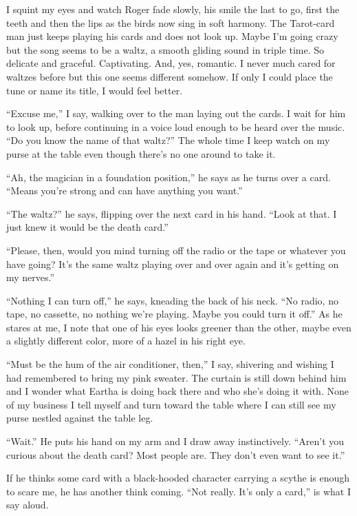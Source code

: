 \documentclass[
]{article}
\begin{document}
I squint my eyes and watch Roger fade slowly, his smile the last to go,
first the teeth and then the lips as the birds now sing in soft harmony.
The Tarot-card man just keeps playing his cards and does not look up.
Maybe I'm going crazy but the song seems to be a waltz, a smooth gliding
sound in triple time. So delicate and graceful. Captivating. And, yes,
romantic. I never much cared for waltzes before but this one seems
different somehow. If only I could place the tune or name its title, I
would feel better.

``Excuse me,'' I say, walking over to the man laying out the cards. I
wait for him to look up, before continuing in a voice loud enough to be
heard over the music. ``Do you know the name of that waltz?'' The whole
time I keep watch on my purse at the table even though there's no one
around to take it.

``Ah, the magician in a foundation position,'' he says as he turns over
a card. ``Means you're strong and can have anything you want.''

``The waltz?'' he says, flipping over the next card in his hand. ``Look
at that. I just knew it would be the death card.''

``Please, then, would you mind turning off the radio or the tape or
whatever you have going? It's the same waltz playing over and over again
and it's getting on my nerves.''

``Nothing I can turn off,'' he says, kneading the back of his neck. ``No
radio, no tape, no cassette, no nothing we're playing. Maybe you could
turn it off.'' As he stares at me, I note that one of his eyes looks
greener than the other, maybe even a slightly different color, more of a
hazel in his right eye.

``Must be the hum of the air conditioner, then,'' I say, shivering and
wishing I had remembered to bring my pink sweater. The curtain is still
down behind him and I wonder what Eartha is doing back there and who
she's doing it with. None of my business I tell myself and turn toward
the table where I can still see my purse nestled against the table leg.

``Wait.'' He puts his hand on my arm and I draw away instinctively.
``Aren't you curious about the death card? Most people are. They don't
even want to see it.''

If he thinks some card with a black-hooded character carrying a scythe
is enough to scare me, he has another think coming. ``Not really. It's
only a card,'' is what I say aloud.
\end{document}
